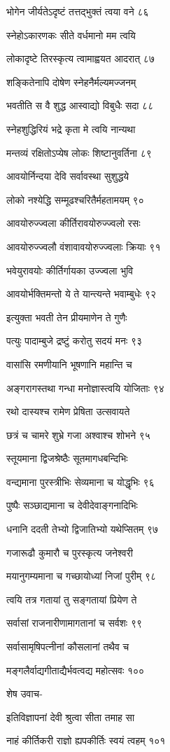 भोगेन जीर्यतेऽदृष्टं तत्तद्भुक्तं त्वया वने ८६

स्नेहोऽकारणकः सीते वर्धमानो मम त्वयि

लोकादृष्टे तिरस्कृत्य त्वामाह्वयत आदरात् ८७

शङ्कितेनापि दोषेण स्नेहनैर्मल्यमज्जनम्

भवतीति स वै शुद्ध आस्वाद्यो विबुधैः सदा ८८

स्नेहशुद्धिरियं भद्रे कृता मे त्वयि नान्यथा

मन्तव्यं रक्षितोऽप्येष लोकः शिष्टानुवर्तिना ८९

आवयोर्निन्दया देवि सर्वावस्था सुशुद्धये

लोको नश्येद्धि सम्मूढश्चरितैर्महतामयम् ९०

आवयोरुज्ज्वला कीर्तिरावयोरुज्ज्वलो रसः

आवयोरुज्ज्वलौ वंशावावयोरुज्ज्वलाः क्रियाः ९१

भवेयुरावयोः कीर्तिर्गायका उज्ज्वला भुवि

आवयोर्भक्तिमन्तो ये ते यान्त्यन्ते भवाम्बुधेः ९२

इत्युक्ता भवती तेन प्रीयमाणेन ते गुणैः

पत्युः पादाम्बुजे द्रष्टुं करोतु सदयं मनः ९३

वासांसि रमणीयानि भूषणानि महान्ति च

अङ्गरागस्तथा गन्धा मनोज्ञास्त्वयि योजिताः ९४

रथो दास्यश्च रामेण प्रेषिता उत्सवायते

छत्रं च चामरे शुभ्रे गजा अश्वाश्च शोभने ९५

स्तूयमाना द्विजश्रेष्ठैः सूतमागधबन्दिभिः

वन्द्यमाना पुरस्त्रीभिः सेव्यमाना च योद्धृभिः ९६

पुष्पैः सञ्छाद्यमाना च देवीदेवाङ्गनादिभिः

धनानि ददती तेभ्यो द्विजातिभ्यो यथेप्सितम् ९७

गजारूढौ कुमारौ च पुरस्कृत्य जनेश्वरी

मयानुगम्यमाना च गच्छायोध्यां निजां पुरीम् ९८

त्वयि तत्र गतायां तु सङ्गतायां प्रियेण ते

सर्वासां राजनारीणामागतानां च सर्वशः ९९

सर्वासामृषिपत्नीनां कौसलानां तथैव च

मङ्गलैर्वाद्यगीताद्यैर्भवत्वद्य महोत्सवः १००

शेष उवाच-

इतिविज्ञापनां देवी श्रुत्वा सीता तमाह सा

नाहं कीर्तिकरी राज्ञो ह्यपकीर्तिः स्वयं त्वहम् १०१

